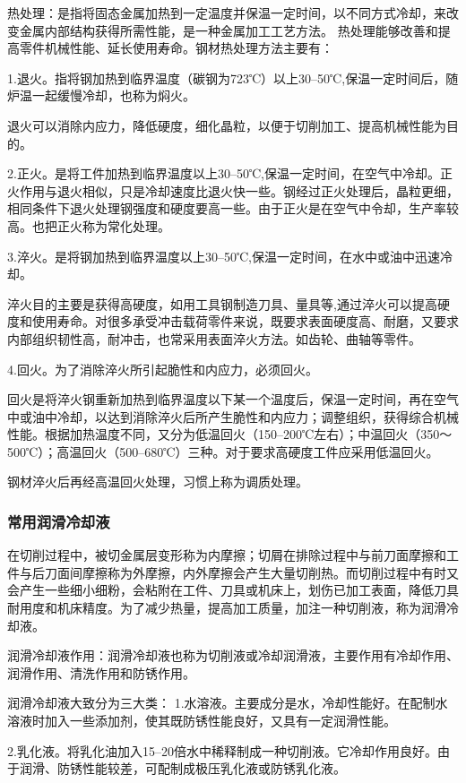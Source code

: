 \documentclass{ctexbook}
\begin{document}
热处理：是指将固态金属加热到一定温度并保温一定时间，以不同方式冷却，来改变金属内部结构获得所需性能，是一种金属加工工艺方法。
热处理能够改善和提高零件机械性能、延长使用寿命。钢材热处理方法主要有：

1.退火。指将钢加热到临界温度（碳钢为723℃）以上30--50℃,保温一定时间后，随炉温一起缓慢冷却，也称为焖火。

退火可以消除内应力，降低硬度，细化晶粒，以便于切削加工、提高机械性能为目的。

2.正火。是将工件加热到临界温度以上30--50℃,保温一定时间，在空气中冷却。正火作用与退火相似，只是冷却速度比退火快一些。钢经过正火处理后，晶粒更细，相同条件下退火处理钢强度和硬度要高一些。由于正火是在空气中令却，生产率较高。也把正火称为常化处理。

3.淬火。是将钢加热到临界温度以上30--50℃,保温一定时间，在水中或油中迅速冷却。

淬火目的主要是获得高硬度，如用工具钢制造刀具、量具等,通过淬火可以提高硬度和使用寿命。对很多承受冲击载荷零件来说，既要求表面硬度高、耐磨，又要求内部组织韧性高，耐冲击，也常采用表面淬火方法。如齿轮、曲轴等零件。

4.回火。为了消除淬火所引起脆性和内应力，必须回火。

回火是将淬火钢重新加热到临界温度以下某一个温度后，保温一定时间，再在空气中或油中冷却，以达到消除淬火后所产生脆性和内应力；调整组织，获得综合机械性能。根据加热温度不同，又分为低温回火（150--200℃左右）；中温回火（350〜500℃）；高温回火（500--680℃）三种。对于要求高硬度工件应采用低温回火。

钢材淬火后再经高温回火处理，习惯上称为调质处理。
\subsubsection{常用润滑冷却液}
在切削过程中，被切金属层变形称为内摩擦；切屑在排除过程中与前刀面摩擦和工件与后刀面间摩擦称为外摩擦，内外摩擦会产生大量切削热。而切削过程中有时又会产生一些细小细粉，会粘附在工件、刀具或机床上，划伤已加工表面，降低刀具耐用度和机床精度。为了减少热量，提高加工质量，加注一种切削液，称为润滑冷却液。

润滑冷却液作用：润滑冷却液也称为切削液或冷却润滑液，主要作用有冷却作用、润滑作用、清洗作用和防锈作用。

润滑冷却液大致分为三大类：
1.水溶液。主要成分是水，冷却性能好。在配制水溶液时加入一些添加剂，使其既防锈性能良好，又具有一定润滑性能。

2.乳化液。将乳化油加入15--20倍水中稀释制成一种切削液。它冷却作用良好。由于润滑、防锈性能较差，可配制成极压乳化液或防锈乳化液。
\end{document}
